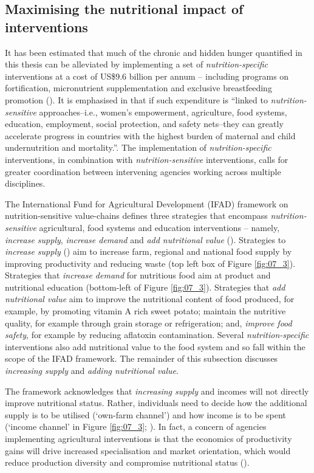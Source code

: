 \subsection{Maximising the nutritional impact of interventions}
It has been estimated that much of the chronic and hidden hunger quantified in this thesis can be alleviated by implementing a set of \textit{nutrition-specific} interventions at a cost of US\$9.6 billion per annum -- including programs on fortification, micronutrient supplementation and exclusive breastfeeding promotion (\citealp{Bhutta2013}). It is emphasised in \citet[p.~452]{Bhutta2013} that if such expenditure is ``linked to \textit{nutrition-sensitive} approaches--i.e., women's empowerment, agriculture, food systems, education, employment, social protection, and safety nets--they can greatly accelerate progress in countries with the highest burden of maternal and child undernutrition and mortality.''. The implementation of \textit{nutrition-specific} interventions, in combination with \textit{nutrition-sensitive} interventions, calls for greater coordination between intervening agencies working across multiple disciplines.

The International Fund for Agricultural Development (IFAD) framework on nutrition-sensitive value-chains defines three strategies that encompass \textit{nutrition-sensitive} agricultural, food systems and education interventions -- namely, \textit{increase supply}, \textit{increase demand} and \textit{add nutritional value} (\citealp{DeLaPena2018}). Strategies to \textit{increase supply} (\citealp{Ruel2013}) aim to increase farm, regional and national food supply by improving productivity and reducing waste (top left box of Figure \ref{fig:07_3}). Strategies that \textit{increase demand} for nutritious food aim at product and nutritional education (bottom-left of Figure \ref{fig:07_3}). Strategies that \textit{add nutritional value} aim to improve the nutritional content of food produced, for example, by promoting vitamin A rich sweet potato; maintain the nutritive quality, for example through grain storage or refrigeration; and, \textit{improve food safety}, for example by reducing aflatoxin contamination. Several \textit{nutrition-specific} interventions also add nutritional value to the food system and so fall within the scope of the IFAD framework. The remainder of this subsection discusses \textit{increasing supply} and \textit{adding nutritional value}.

The framework acknowledges that \textit{increasing supply} and incomes will not directly improve nutritional status. Rather, individuals need to decide how the additional supply is to be utilised (`own-farm channel') and how income is to be spent (`income channel' in Figure \ref{fig:07_3}; \citealp{Price2018, Kazianga2017, Galie2015}). In fact, a concern of agencies implementing agricultural interventions is that the economics of productivity gains will drive increased specialisation and market orientation, which would reduce production diversity and compromise nutritional status (\citealp{Tscharntke2012}).



